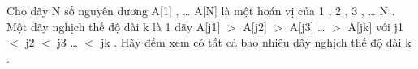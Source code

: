 Cho dãy N số nguyên dương A[1] , … A[N] là một hoán vị của 1 , 2 , 3 , … N .   
\\   Một dãy nghịch thế độ dài k là 1 dãy A[j1] $>$ A[j2] $>$ A[j3] … $>$ A[jk] với j1 $<$ j2 $<$ j3 … $<$ jk . Hãy đếm xem có tất cả bao nhiêu dãy nghịch thế độ dài k .  

\